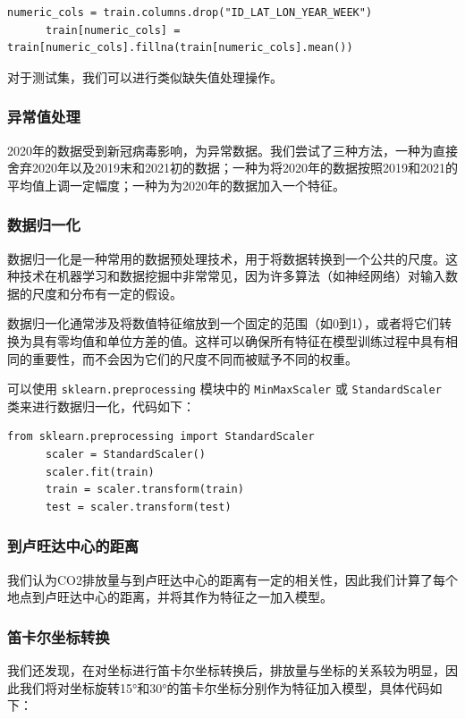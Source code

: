 \documentclass{ctexart}
\begin{document}
\begin{lstlisting}[style=Python]
      numeric_cols = train.columns.drop("ID_LAT_LON_YEAR_WEEK")
      train[numeric_cols] = train[numeric_cols].fillna(train[numeric_cols].mean())
\end{lstlisting}

对于测试集，我们可以进行类似缺失值处理操作。

\subsubsection{异常值处理}
2020年的数据受到新冠病毒影响，为异常数据。我们尝试了三种方法，一种为直接舍弃2020年以及2019末和2021初的数据；一种为将2020年的数据按照2019和2021的平均值上调一定幅度；一种为为2020年的数据加入一个特征。

\subsubsection{数据归一化}

数据归一化是一种常用的数据预处理技术，用于将数据转换到一个公共的尺度。这种技术在机器学习和数据挖掘中非常常见，因为许多算法（如神经网络）对输入数据的尺度和分布有一定的假设。

数据归一化通常涉及将数值特征缩放到一个固定的范围（如0到1），或者将它们转换为具有零均值和单位方差的值。这样可以确保所有特征在模型训练过程中具有相同的重要性，而不会因为它们的尺度不同而被赋予不同的权重。

可以使用 \texttt{sklearn.preprocessing} 模块中的 \texttt{MinMaxScaler} 或 \texttt{StandardScaler} 类来进行数据归一化，代码如下：

\begin{lstlisting}[style=Python]
      from sklearn.preprocessing import StandardScaler
      scaler = StandardScaler()
      scaler.fit(train)
      train = scaler.transform(train)
      test = scaler.transform(test)
\end{lstlisting}

\subsubsection{到卢旺达中心的距离}
我们认为CO2排放量与到卢旺达中心的距离有一定的相关性，因此我们计算了每个地点到卢旺达中心的距离，并将其作为特征之一加入模型。

\subsubsection{笛卡尔坐标转换}
我们还发现，在对坐标进行笛卡尔坐标转换后，排放量与坐标的关系较为明显，因此我们将对坐标旋转15°和30°的笛卡尔坐标分别作为特征加入模型，具体代码如下：
\end{document}
